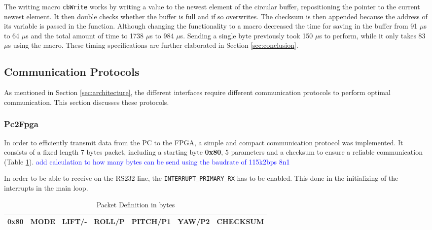 \documentclass{article}
\newcommand\todo[1]{\textcolor{blue}{#1}} %
\begin{document}
The writing macro \texttt{cbWrite} works by writing a value to the newest element of the circular buffer, repositioning the pointer to the current newest element. It then double checks whether the buffer is full and if so overwrites. The checksum is then appended because the address of its variable is passed in the function. Although changing the functionality to a macro decreased the time for saving in the buffer from 91 $\mu$s to 64 $\mu$s and the total amount of time to 1738 $\mu$s to 984 $\mu$s. Sending a single byte previously took 150 $\mu$s to perform, while it only takes 83 $\mu$s using the macro. These timing specifications are further elaborated in Section \ref{sec:conclusion}.

\subsection{Communication Protocols}
As mentioned in Section \ref{sec:architecture}, the different interfaces require different communication protocols to perform optimal communication. This section discusses these protocols. 


\subsubsection{Pc2Fpga}
In order to efficiently transmit  data from the PC to the FPGA, a simple and compact communication protocol was implemented. It consists of a fixed length 7 bytes packet, including a starting byte \textbf{0x80}, 5 parameters and a checksum to ensure a reliable communication (Table \ref{tbl:PkgDefinition}). \todo{add calculation to how many bytes can be send using the baudrate of 115k2bps 8n1}

In order to be able to receive on the RS232 line, the \texttt{INTERRUPT\_PRIMARY\_RX} has to be enabled. This done in the initializing of the interrupts in the main loop. 

\begin{table}[ht]
\centering
\begin{tabular}{|c|c|c|c|c|c|c|}
\hline 
0x80 & MODE & LIFT/- & ROLL/P & PITCH/P1 & YAW/P2 & CHECKSUM \\ 
\hline 
\end{tabular} 
\caption{Packet Definition in bytes}
\label{tbl:PkgDefinition}
\end{table}
\end{document}
